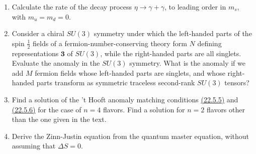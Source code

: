 

\begin{enumerate}
\item Calculate the rate of the decay process $\eta\to\gamma+\gamma$, to
leading order in $m_s$, with $m_u=m_d=0$.

\item Consider a chiral $SU(3)$ symmetry under which the left-handed parts
of the spin $\frac{1}{2}$ fields of a fermion-number-conserving theory form
$N$ defining representations $\boldsymbol{3}$ of $SU(3)$, while the
right-handed parts are all singlets. Evaluate the anomaly in the $SU(3)$
symmetry. What is the anomaly if we add $M$ fermion fields whose left-handed
parts are singlets, and whose right-handed parts transform as symmetric
traceless second-rank $SU(3)$ tensors?

\item Find a solution of the 't Hooft anomaly matching conditions
\hyperref[eq:22.5.5]{(22.5.5)} and \hyperref[eq:22.5.6]{(22.5.6)} for the
case of $n=4$ flavors. Find a solution for $n=2$ flavors other than the one
given in the text.

\item Derive the Zinn-Justin equation from the quantum master equation,
without assuming that $\Delta S=0$.
\end{enumerate}


